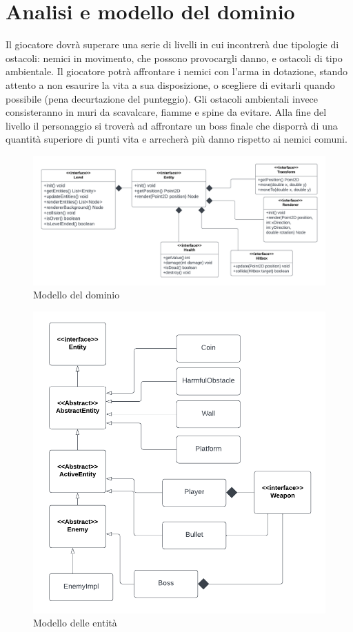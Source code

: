 \documentclass[a4paper,12pt]{report}
\begin{document}
\section{Analisi e modello del dominio}
Il giocatore dovrà superare una serie di livelli in cui incontrerà due tipologie di ostacoli: nemici in movimento, che possono provocargli danno, e ostacoli di tipo ambientale.
Il giocatore potrà affrontare i nemici con l'arma in dotazione, stando attento a non esaurire la vita a sua disposizione, o scegliere di evitarli quando possibile (pena decurtazione del punteggio).
Gli ostacoli ambientali invece consisteranno in muri da scavalcare, fiamme e spine da evitare.
Alla fine del livello il personaggio si troverà ad affrontare un boss finale che disporrà di una quantità superiore di punti vita e arrecherà più danno rispetto ai nemici comuni.

\begin{figure}
\includegraphics[width=1\textwidth]{umlModello.png}
\caption{Modello del dominio}
\label{fig:schgen}
\end{figure}

\begin{figure}
\includegraphics[width=1\textwidth]{umlEntita.png}
\caption{Modello delle entità}
\label{fig:schgen}
\end{figure}
\end{document}
